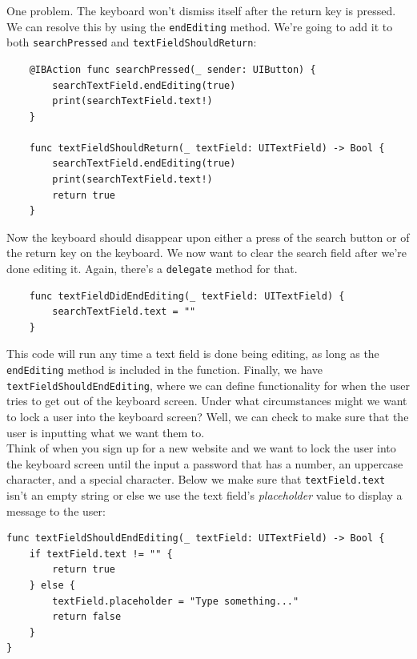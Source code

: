 \documentclass[12pt, letterpaper]{article}
\begin{document}
One problem. The keyboard won't dismiss itself after the return key is pressed. We can resolve this by using the 
\verb+endEditing+ method. We're going to add it to both \verb+searchPressed+ and \verb+textFieldShouldReturn+:

\begin{verbatim}
    @IBAction func searchPressed(_ sender: UIButton) {
        searchTextField.endEditing(true)
        print(searchTextField.text!)
    }

    func textFieldShouldReturn(_ textField: UITextField) -> Bool {
        searchTextField.endEditing(true)
        print(searchTextField.text!)
        return true
    }
\end{verbatim}

Now the keyboard should disappear upon either a press of the search button or of the return key on the keyboard. We
now want to clear the search field after we're done editing it. Again, there's a \verb+delegate+ method for that. \\

\begin{verbatim}
    func textFieldDidEndEditing(_ textField: UITextField) {
        searchTextField.text = ""
    }
\end{verbatim}

This code will run any time a text field is done being editing, as long as the \verb+endEditing+ method is included in the
function. Finally, we have \verb+textFieldShouldEndEditing+, where we can define functionality for when the user tries
to get out of the keyboard screen. Under what circumstances might we want to lock a user into the keyboard screen?
Well, we can check to make sure that the user is inputting what we want them to. \\

Think of when you sign up for a new website and we want to lock the user into the keyboard screen until the input a 
password that has a number, an uppercase character, and a special character. Below we make sure that 
\verb+textField.text+ isn't an empty string or else we use the text field's \emph{placeholder} value 
to display a message to the user:

\begin{verbatim}
func textFieldShouldEndEditing(_ textField: UITextField) -> Bool {
    if textField.text != "" {
        return true
    } else {
        textField.placeholder = "Type something..."
        return false
    }
}
\end{verbatim}
\end{document}
